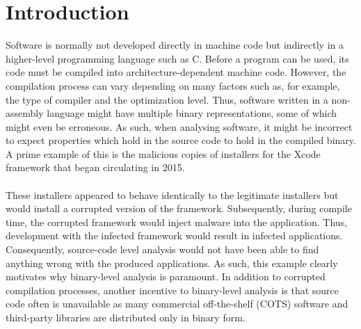 \documentclass{kththesis}
\newcommand{\fbcomment}[1]{{#1}}
\renewcommand{\fbcomment}[1]{}
\begin{document}

\chapter{Introduction}
\fbcomment{\color{red}Goal: Introduce the reader to why the topic is relevant, what the problem statement is and the outline of the thesis}
Software is normally not developed directly in machine code but indirectly in a higher-level programming language such as C. Before a program can be used, its code must be compiled into architecture-dependent machine code. However, the compilation process can vary depending on many factors such as, for example, the type of compiler and the optimization level. Thus, software written in a non-assembly language might have multiple binary representations, some of which might even be erroneous\cite{preciseCFG}. As such, when analysing software, it might be incorrect to expect properties which hold in the source code to hold in the compiled binary. A prime example of this is the malicious copies of installers for the Xcode\cite{XcodeBook} framework that began circulating in 2015\cite{XcodeGhost}.
\\ \\ 
These installers appeared to behave identically to the legitimate installers but would install a corrupted version of the framework. Subsequently, during compile time, the corrupted framework would inject malware into the application. Thus, development with the infected framework would result in infected applications. Consequently, source-code level analysis would not have been able to find anything wrong with the produced applications. As such, this example clearly motivates why binary-level analysis is paramount. In addition to corrupted compilation processes, another incentive to binary-level analysis is that source code often is unavailable as many commercial off-the-shelf (COTS) software and third-party libraries are distributed only in binary form\cite{preciseCFG}.
\\ \\
\end{document}
